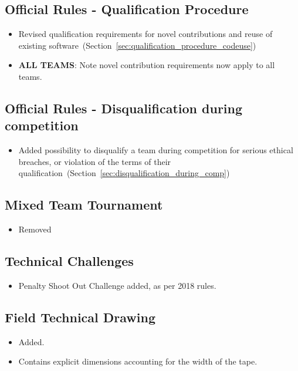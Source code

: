 \subsection*{Official Rules - Qualification Procedure}
\begin{itemize}
  \item Revised qualification requirements for novel contributions and reuse of existing software~(\cf Section~\ref{sec:qualification_procedure_codeuse})
  \item \textbf{ALL TEAMS}: Note novel contribution requirements now apply to all teams.
\end{itemize}


\subsection*{Official Rules - Disqualification during competition}
\begin{itemize}
  \item Added possibility to disqualify a team during competition for serious ethical breaches, or violation of the terms of their qualification~(\cf Section~\ref{sec:disqualification_during_comp})
\end{itemize}

\subsection*{Mixed Team Tournament}
\begin{itemize}
  \item Removed
\end{itemize}

\subsection*{Technical Challenges}
\begin{itemize}
  \item Penalty Shoot Out Challenge added, as per 2018 rules.
\end{itemize}

\subsection*{Field Technical Drawing}
\begin{itemize}
  \item Added.
  \item Contains explicit dimensions accounting for the width of the tape.
\end{itemize}

